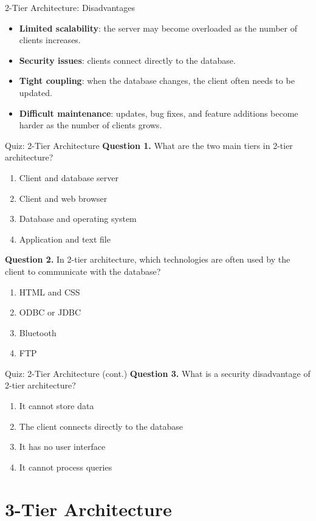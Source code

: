 \documentclass[aspectratio=169,11pt]{beamer}
\newcommand{\keyword}[1]{\textcolor{accent}{\textbf{#1}}}
\newcommand{\tightlist}{\setlength{\itemsep}{2pt}\setlength{\parskip}{0pt}}
\newcommand{\qoption}[2]{\item[#1.] #2}
\begin{document}
\begin{frame}{2-Tier Architecture: Disadvantages}
\small
\begin{itemize}
\tightlist
  \item \keyword{Limited scalability}: the server may become overloaded as the number of clients increases.
  \item \keyword{Security issues}: clients connect directly to the database.
  \item \keyword{Tight coupling}: when the database changes, the client often needs to be updated.
  \item \keyword{Difficult maintenance}: updates, bug fixes, and feature additions become harder as the number of clients grows.
\end{itemize}
\end{frame}

\begin{frame}{Quiz: 2-Tier Architecture}
\small
\textbf{Question 1.} What are the two main tiers in 2-tier architecture?
\begin{enumerate}
\tightlist
  \qoption{A}{Client and database server}
  \qoption{B}{Client and web browser}
  \qoption{C}{Database and operating system}
  \qoption{D}{Application and text file}
\end{enumerate}

\textbf{Question 2.} In 2-tier architecture, which technologies are often used by the client to communicate with the database?
\begin{enumerate}
\tightlist
  \qoption{A}{HTML and CSS}
  \qoption{B}{ODBC or JDBC}
  \qoption{C}{Bluetooth}
  \qoption{D}{FTP}
\end{enumerate}
\end{frame}

\begin{frame}{Quiz: 2-Tier Architecture (cont.)}
\small
\textbf{Question 3.} What is a security disadvantage of 2-tier architecture?
\begin{enumerate}
\tightlist
  \qoption{A}{It cannot store data}
  \qoption{B}{The client connects directly to the database}
  \qoption{C}{It has no user interface}
  \qoption{D}{It cannot process queries}
\end{enumerate}
\end{frame}

\section{3-Tier Architecture}
\end{document}
